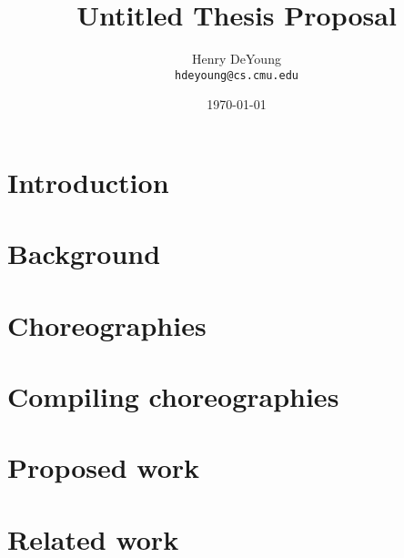 \documentclass{article}
\begin{document}
\title{Untitled Thesis Proposal}
\author{Henry DeYoung\\\texttt{hdeyoung@cs.cmu.edu}}
\date{\today}
\maketitle

\begin{abstract}
\end{abstract}

\section{Introduction}\label{sec:introduction}



\section{Background}\label{sec:background}



\section{Choreographies}\label{sec:choreographies}



\section{Compiling choreographies}\label{sec:compile-choreo}



\section{Proposed work}\label{sec:extensions}



\section{Related work}\label{sec:related-work}




\printbibliography
\end{document}
